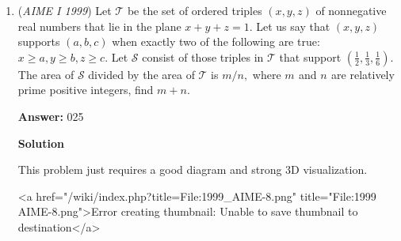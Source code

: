\begin{enumerate}
            \begin{itemize}
        \item Case of a single 2:
            \end{itemize}
            
            \begin{enumerate}[label=(\roman*)]
                \item The switches must be one of $(2\cdot \mathrm{odd})(\mathrm{odd})(\mathrm{odd})$ or $(\mathrm{odd})(2 \cdot \mathrm{odd})(\mathrm{odd})$ or $(\mathrm{odd})(\mathrm{odd})(2 \cdot \mathrm{odd})$.
            \end{enumerate}
            
            \begin{enumerate}[label=(\roman*)]
                \item Since $0 \le x,y,z \le 9,$ the terms $2\cdot 1, 2 \cdot 3,$ and $2 \cdot 5$ are three valid choices for the $(2 \cdot odd)$ factor above.
            \end{enumerate}
            
            \begin{enumerate}[label=(\roman*)]
                \item We have ${3\choose{1}} \cdot 3 \cdot 5^{2}= 225$ ways.
            \end{enumerate}
            The number of switches in position A is $1000-125-225 = \boxed{650}$.

 


	\item (\textit{AIME I 1999}) Let $\mathcal{T}$ be the set of ordered triples $(x,y,z)$ of nonnegative real numbers that lie in the plane $x+y+z=1.$  Let us say that $(x,y,z)$ supports $(a,b,c)$ when exactly two of the following are true: $x\ge a, y\ge b, z\ge c.$  Let $\mathcal{S}$ consist of those triples in $\mathcal{T}$ that support $\left(\frac 12,\frac 13,\frac 16\right).$  The area of $\mathcal{S}$ divided by the area of $\mathcal{T}$ is $m/n,$  where $m_{}$ and $n_{}$ are relatively prime positive integers, find $m+n.$

 \textbf{Answer: }025



\textbf{Solution}

This problem just requires a good diagram and strong 3D visualization.

 <a href="/wiki/index.php?title=File:1999\_AIME-8.png" title="File:1999 AIME-8.png">Error creating thumbnail: Unable to save thumbnail to destination</a>


\end{enumerate}
